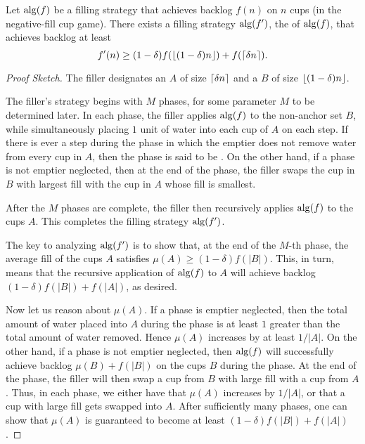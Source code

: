 \begin{lemma}
  Let $\operatorname{\text{\textup{alg}}}(f)$ be a filling strategy that achieves backlog
  $f(n)$ on $n$ cups (in the negative-fill cup game). There exists a filling strategy $\operatorname{\text{\textup{alg}}}(f')$,
  the  of $\operatorname{\text{\textup{alg}}}(f)$, that achieves backlog at
  least $$f'(n) \ge (1-\delta) f(\left\lfloor (1-\delta)n \right\rfloor) +
  f(\left\lceil \delta n \right\rceil).$$
\end{lemma}
\begin{proof}[Proof Sketch]
The filler designates an  $A$ of size
$\left\lceil \delta n \right\rceil$ and a  $B$ of size
$\left\lfloor (1-\delta)n \right\rfloor$.

The filler's strategy begins with $M$ phases, for some parameter $M$
to be determined later. In each phase,
the filler applies $\operatorname{\text{\textup{alg}}}(f)$ to the non-anchor set $B$, while
simultaneously placing $1$ unit of water into each cup of $A$ on each
step. If there is ever a step during the phase in which the emptier
does not remove water from every cup in $A$, then the phase is said to
be . On the other hand, if a phase is not
emptier neglected, then at the end of the phase, the filler swaps the
cup in $B$ with largest fill with the cup in $A$ whose fill is
smallest.

After the $M$ phases are complete, the filler then recursively
applies $\operatorname{\text{\textup{alg}}}(f)$ to the cups $A$. This completes the filling strategy
$\operatorname{\text{\textup{alg}}}(f')$.

The key to analyzing $\operatorname{\text{\textup{alg}}}(f')$ is to show that, at the end of the
$M$-th phase, the average fill of the cups $A$ satisfies
$\mu(A) \ge (1 - \delta) f(|B|)$. This, in turn, means that the
recursive application of $\operatorname{\text{\textup{alg}}}(f)$ to $A$ will achieve backlog
$(1 - \delta) f(|B|) + f(|A|)$, as desired.

Now let us reason about $\mu(A)$. If a phase is emptier neglected,
then the total amount of water placed into $A$ during the phase is at
least $1$ greater than the total amount of water removed. Hence
$\mu(A)$ increases by at least $1/|A|$. On the other hand, if a phase
is not emptier neglected, then $\operatorname{\text{\textup{alg}}}(f)$ will successfully achieve
backlog $\mu(B) + f(|B|)$ on the cups $B$ during the phase. At the end
of the phase, the filler will then swap a cup from $B$ with large fill
with a cup from $A$. Thus, in each phase, we either have that $\mu(A)$
increases by $1 / |A|$, or that a cup with large fill gets swapped
into $A$. After sufficiently many phases, one can show that $\mu(A)$
is guaranteed to become at least $(1 - \delta)f(|B|) + f(|A|)$.




\end{proof}
